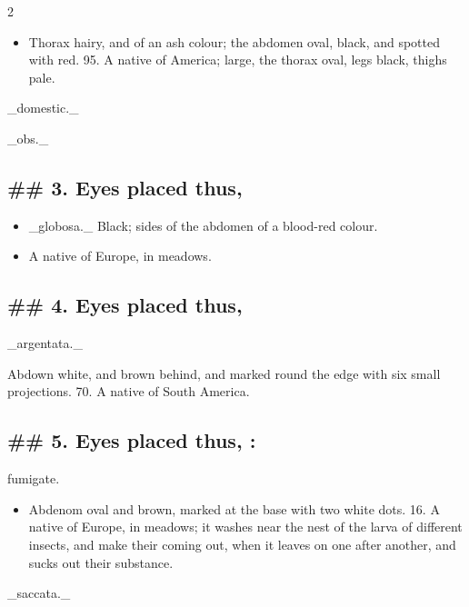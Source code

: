 \documentclass[10pt]{article}
\begin{document}
\begin{multicols}{2}
\begin{itemize}\setlength{\itemsep}{1pt}
\item Thorax hairy, and of an ash colour; the abdomen oval, black, and spotted with red. 95. A native of America; large, the thorax oval, legs black, thighs pale.
\end{itemize}
\_domestic.\_

\_obs.\_

\subsection*{\#\# 3. Eyes placed thus,}
\begin{itemize}\setlength{\itemsep}{1pt}
\item \_globosa.\_ Black; sides of the abdomen of a blood-red colour.
\item A native of Europe, in meadows.
\end{itemize}
\subsection*{\#\# 4. Eyes placed thus,}
\_argentata.\_

Abdown white, and brown behind, and marked round the edge with six small projections. 70. A native of South America.

\subsection*{\#\# 5. Eyes placed thus, :}
fumigate.

\begin{itemize}\setlength{\itemsep}{1pt}
\item Abdenom oval and brown, marked at the base with two white dots. 16. A native of Europe, in meadows; it washes near the nest of the larva of different insects, and make their coming out, when it leaves on one after another, and sucks out their substance.
\end{itemize}
\_saccata.\_


\end{multicols}
\end{document}
